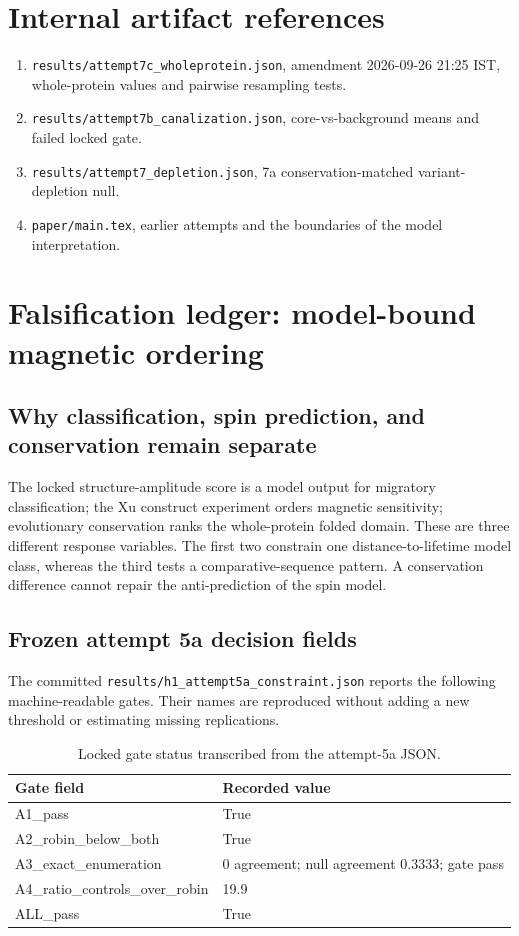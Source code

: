 \section{Internal artifact references}
\begin{enumerate}\item \texttt{results/attempt7c\_wholeprotein.json}, amendment 2026-09-26 21:25 IST, whole-protein values and pairwise resampling tests.\item \texttt{results/attempt7b\_canalization.json}, core-vs-background means and failed locked gate.\item \texttt{results/attempt7\_depletion.json}, 7a conservation-matched variant-depletion null.\item \texttt{paper/main.tex}, earlier attempts and the boundaries of the model interpretation.\end{enumerate}

\section{Falsification ledger: model-bound magnetic ordering}
\subsection{Why classification, spin prediction, and conservation remain separate}
The locked structure-amplitude score is a model output for migratory classification; the Xu construct experiment orders magnetic sensitivity; evolutionary conservation ranks the whole-protein folded domain. These are three different response variables. The first two constrain one distance-to-lifetime model class, whereas the third tests a comparative-sequence pattern. A conservation difference cannot repair the anti-prediction of the spin model.
\subsection{Frozen attempt 5a decision fields}
The committed \texttt{results/h1\_attempt5a\_constraint.json} reports the following machine-readable gates. Their names are reproduced without adding a new threshold or estimating missing replications.\begin{table}[!htbp]\centering\small\caption{Locked gate status transcribed from the attempt-5a JSON.}\begin{tabular}{lp{7cm}}\hline Gate field & Recorded value \\\hline
A1\_pass & True \\
A2\_robin\_below\_both & True \\
A3\_exact\_enumeration & 0 agreement; null agreement 0.3333; gate pass \\
A4\_ratio\_controls\_over\_robin & 19.9 \\
ALL\_pass & True \\
\hline\end{tabular}\end{table}
